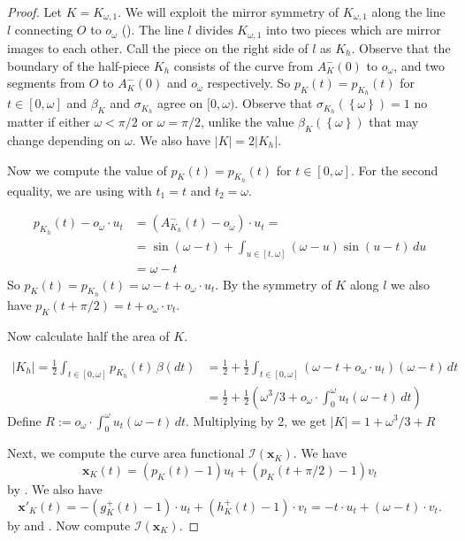 \begin{proof}
Let \(K = K_{\omega, 1}\). We will exploit the mirror symmetry of \(K_{\omega, 1}\) along the line \(l\) connecting \(O\) to \(o_\omega\) (). The line \(l\) divides \(K_{\omega, 1}\) into two pieces which are mirror images to each other. Call the piece on the right side of \(l\) as \(K_h\). Observe that the boundary of the half-piece \(K_h\) consists of the curve from \(A_K^-(0)\) to \(o_\omega\), and two segments from \(O\) to \(A_K^-(0)\) and \(o_\omega\) respectively. So \(p_{K}(t) = p_{K_h}(t)\) for \(t \in [0, \omega]\) and \(\beta_K\) and \(\sigma_{K_h}\) agree on \([0, \omega)\). Observe that \(\sigma_{K_h}\left( \left\{ \omega \right\} \right) = 1\) no matter if either \(\omega < \pi/2\) or \(\omega = \pi/2\), unlike the value \(\beta_K(\left\{ \omega \right\})\) that may change depending on \(\omega\). We also have \(|K| = 2 |K_h|\).

Now we compute the value of \(p_{K}(t) = p_{K_h}(t)\) for \(t \in [0, \omega]\). For the second equality, we are using  with \(t_1 = t\) and \(t_2 = \omega\).

\begin{align*}
p_{K_h}(t) - o_\omega \cdot u_t & = (A^-_{K_h}(t) - o_\omega) \cdot u_t =  \\
& = \sin(\omega - t) + \int_{u \in [t, \omega] } (\omega - u) \sin \left( u - t \right) \, du \\
& = \omega - t
\end{align*}
So \(p_{K}(t) = p_{K_h}(t) = \omega - t + o_\omega \cdot u_t\). By the symmetry of \(K\) along \(l\) we also have \(p_K(t + \pi/2) = t + o_{\omega} \cdot v_t\).

Now calculate half the area of \(K\).

\begin{align*}
|K_h| = \frac{1}{2} \int_{t \in [0, \omega]} p_{K_h}(t) \, \beta(dt) & = 
\frac{1}{2} + \frac{1}{2} \int_{t \in [0, \omega]} \left( \omega - t + o_\omega \cdot u_t \right)  (\omega-t) \, dt \\
& = \frac{1}{2} + \frac{1}{2} \left( \omega^3 / 3 + o_\omega \cdot \int_{0}^{\omega} u_t (\omega - t)\, dt \right) 
\end{align*}
Define \(R := o_\omega \cdot \int_{0}^{\omega} u_t (\omega - t)\, dt\). Multiplying by 2, we get \(|K| = 1 + \omega^3 / 3 + R\)

Next, we compute the curve area functional \(\mathcal{I}(\mathbf{x}_{K})\). We have
\[
\mathbf{x}_{K}(t) = (p_{K}(t) - 1)u_t + (p_{K}(t + \pi/2) - 1) v_t
\]
by . We also have
\begin{equation}
\label{eqn:a1-maximizer-x-deriv}
\mathbf{x}'_{K}(t) = -(g_{K}^+(t) - 1) \cdot u_t + (h_{K}^+(t) - 1) \cdot v_t = 
- t \cdot u_t + (\omega - t) \cdot v_t.
\end{equation}
by  and . Now compute \(\mathcal{I}(\mathbf{x}_K)\).


\end{proof}

